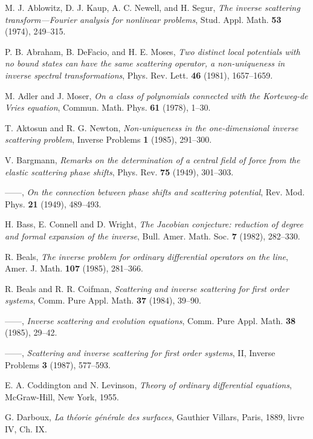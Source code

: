\documentclass{surv-l}
\theoremstyle{plain}
\theoremstyle{definition}
\numberwithin{equation}{chapter}
\begin{document}
\begin{thebibliography}{AKNS}
 M. J. Ablowitz, D. J. Kaup, A. C. Newell, and H. Segur, \emph{The inverse scattering transform---Fourier analysis for nonlinear problems}, Stud. Appl. Math. \textbf{53} (1974), 249--315.

 P. B. Abraham, B. DeFacio, and H. E. Moses, \emph{Two distinct local potentials with no bound states can have the same scattering operator, a non-uniqueness in inverse spectral transformations}, Phys. Rev. Lett. \textbf{46} (1981), 1657--1659.

 M. Adler and J. Moser, \emph{On a class of polynomials connected with the Korteweg-de Vries equation}, Commun. Math. Phys. \textbf{61} (1978), 1--30.

 T. Aktosun and R. G. Newton, \emph{Non-uniqueness in the one-dimensional inverse scattering problem}, Inverse Problems \textbf{1} (1985), 291--300.

 V. Bargmann, \emph{Remarks on the determination of a central field of force from the elastic scattering phase shifts}, Phys. Rev. \textbf{75} (1949), 301--303.

 ------, \emph{On the connection between phase shifts and scattering potential}, Rev. Mod. Phys. \textbf{21} (1949), 489--493.

 H. Bass, E. Connell and D. Wright, \emph{The Jacobian conjecture: reduction of degree and formal expansion of the inverse}, Bull. Amer. Math. Soc. \textbf{7} (1982), 282--330.

 R. Beals, \emph{The inverse problem for ordinary differential operators on the line}, Amer. J. Math. \textbf{107} (1985), 281--366.

 R. Beals and R. R. Coifman, \emph{Scattering and inverse scattering for first order systems}, Comm. Pure Appl. Math. \textbf{37} (1984), 39--90.

 ------, \emph{Inverse scattering and evolution equations}, Comm. Pure Appl. Math. \textbf{38} (1985), 29--42.

 ------, \emph{Scattering and inverse scattering for first order systems}, II, Inverse Problems \textbf{3} (1987), 577--593.

 E. A. Coddington and N. Levinson, \emph{Theory of ordinary differential equations}, McGraw-Hill, New York, 1955.

 G. Darboux, \emph{La th\'{e}orie g\'{e}n\'{e}rale des surfaces}, Gauthier Villars, Paris, 1889, livre IV, Ch. IX.


\end{thebibliography}
\end{document}
